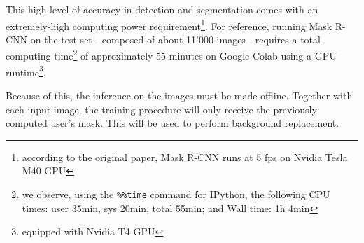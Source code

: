 \medskip

This high-level of accuracy in detection and segmentation comes with an extremely-high computing power requirement\footnote{according to the original paper, Mask R-CNN runs at 5 \gls{fps} on Nvidia Tesla M40 GPU}. For reference, running Mask R-CNN on the test set - composed of about 11'000 images - requires a total computing time\footnote{we observe, using the \texttt{\%\%time} command for IPython, the following CPU times: user 35min, sys 20min, total 55min; and Wall time: 1h 4min} of approximately 55 minutes on Google Colab using a GPU runtime\footnote{equipped with Nvidia T4 GPU}.

Because of this, the inference on the images must be made offline. Together with each input image, the training procedure will only receive the previously computed user's mask. This will be used to perform background replacement.

